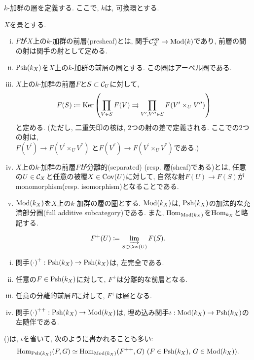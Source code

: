 \documentclass[../main]{subfiles}
\begin{document}
$k$-加群の層を定義する.
ここで, $k$は, 可換環とする.
\begin{dfn}
  $X$を景とする.
  \begin{enumerate}[(i)]
    \item $F$が$X$上の$k$-加群の前層(presheaf)とは,
      関手$\C^{\op}_X \to \Mod(k)$であり,
      前層の間の射は関手の射として定める.
    \item $\Psh(k_X)$を$X$上の$k$-加群の前層の圏とする.
      この圏はアーベル圏である.
    \item $X$上の$k$-加群の前層$F$と$S\subset \C_U$に対して,
      \[
        F(S) \coloneqq
        \Ker\left( \prod_{V\in S}F(V)
        \rightrightarrows
        \prod_{V^\prime,V^\dprime\in S}F(V^\prime \times_U V^\dprime)\right)
      \]
      と定める.
      (ただし, 二重矢印の核は, 2つの射の差で定義される.
      ここでの2つの射は,
      \\
      $F(V^\prime) \to F(V^\prime \times_U V^\dprime)$
      と$F(V^\dprime) \to F(V^\prime \times_U V^\dprime)$である.)
    \item $X$上の$k$-加群の前層$F$が分離的(separated) (resp. 層(sheaf)である)とは,
      任意の$U\in\C_X$と任意の被覆$X\in\Cov(U)$に対して,
      自然な射$F(U)\to F(S)$がmonomorphism(resp. isomorphism)となることである.
    \item $\Mod(k_X)$を$X$上の$k$-加群の層の圏とする.
      $\Mod(k_X)$は, $\Psh(k_X)$の加法的な充満部分圏(full additive subcategory)である.
      また, $\Hom_{\Mod(k_X)}$を$\Hom_{k_X}$と略記する.
  \end{enumerate}
\end{dfn}

\begin{dfn}[層化(sheafification)]
  \[
    F^+(U) \coloneqq
    \ilim[S\in\Cov(U)] F(S).
  \]
\end{dfn}

\begin{thm}
  \begin{enumerate}[(i)]
    \item 関手${(\cdot)}^+ : \Psh(k_X)\to\Psh(k_X)$は, 左完全である.
    \item 任意の$F\in\Psh(k_X)$に対して, $F^+$は分離的な前層となる.
    \item 任意の分離的前層$F$に対して, $F^+$は層となる.
    \item 関手${(\cdot)}^{++} : \Psh(k_X)\to\Mod(k_X)$は,
      埋め込み関手$\iota : \Mod(k_X)\to\Psh(k_X)$の左随伴である.
  \end{enumerate}
\end{thm}
()は, $\iota$を省いて, 次のように書かれることも多い:
\[
  \Hom_{\Psh(k_X)}(F,G)
  \simeq
  \Hom_{\Mod(k_X)}(F^{++},G)
  \,\,(F\in\Psh(k_X),\,G\in\Mod(k_X)).
\]
\end{document}
